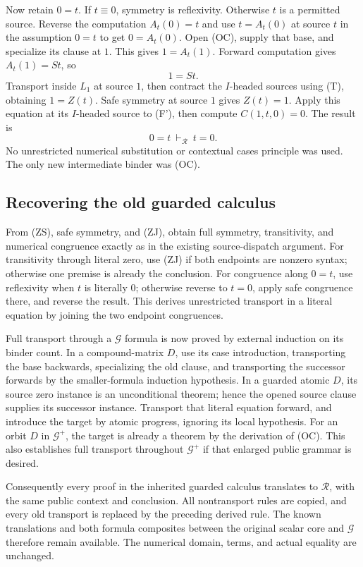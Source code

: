 \documentclass[11pt,letterpaper]{article}
\theoremstyle{definition}\newtheorem{definition}[theorem]{Definition}
\theoremstyle{remark}\newtheorem{remark}[theorem]{Remark}
\begin{document}
Now retain $0=t$. If $t\equiv0$, symmetry is reflexivity. Otherwise
$t$ is a permitted source. Reverse the computation $A_t(0)=t$ and use
$t=A_t(0)$ at source $t$ in the assumption $0=t$ to get $0=A_t(0)$.
Open (OC), supply that base, and specialize its clause at $1$. This
gives $1=A_t(1)$. Forward computation gives $A_t(1)=St$, so
\[
                              1=St.
\]
Transport inside $L_1$ at source $1$, then contract the $I$-headed
sources using (T), obtaining $1=Z(t)$. Safe symmetry at source $1$
gives $Z(t)=1$. Apply this equation at its $I$-headed source to (F'),
then compute $C(1,t,0)=0$. The result is
\[
                       0=t\ \vdash_{\mathcal R}\ t=0.     \tag{ZS}
\]
No unrestricted numerical substitution or contextual cases principle
was used. The only new intermediate binder was (OC).

\subsection{Recovering the old guarded calculus}

From (ZS), safe symmetry, and (ZJ), obtain full symmetry, transitivity,
and numerical congruence exactly as in the existing source-dispatch
argument. For transitivity through literal zero, use (ZJ) if both
endpoints are nonzero syntax; otherwise one premise is already the
conclusion. For congruence along $0=t$, use reflexivity when $t$ is
literally $0$; otherwise reverse to $t=0$, apply safe congruence there,
and reverse the result. This derives unrestricted
transport in a literal equation by joining the two endpoint congruences.

Full transport through a $\mathcal G$ formula is now proved by external
induction on its binder count. In a compound-matrix $D$, use its case
introduction, transporting the base backwards, specializing the old
clause, and transporting the successor forwards by the smaller-formula
induction hypothesis. In a guarded atomic $D$, its source zero instance
is an unconditional theorem; hence the opened source clause supplies
its successor instance. Transport that literal equation forward, and
introduce the target by atomic progress, ignoring its local hypothesis.
For an orbit $D$ in $\mathcal G^+$, the target is already a theorem by
the derivation of (OC). This also establishes full transport throughout
$\mathcal G^+$ if that enlarged public grammar is desired.

Consequently every proof in the inherited guarded calculus translates
to $\mathcal R$, with the same public context and conclusion. All
nontransport rules are copied, and every old transport is replaced by
the preceding derived rule. The known translations and both formula
composites between the original scalar core and $\mathcal G$ therefore
remain available. The numerical domain, terms, and actual equality
are unchanged.
\end{document}
